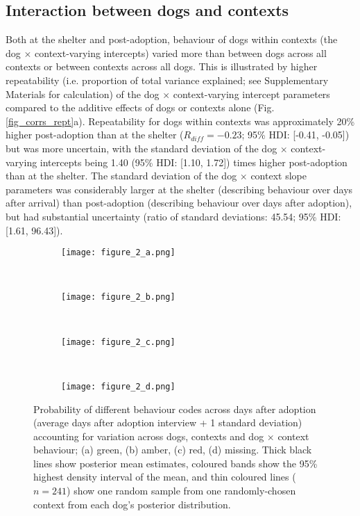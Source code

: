 \documentclass[fleqn,10pt]{wlscirep}
\begin{document}
\subsection*{Interaction between dogs and contexts}
Both at the shelter and post-adoption, behaviour of dogs within contexts (the dog $\times$ context-varying intercepts) varied more than between dogs across all contexts or between contexts across all dogs. This is illustrated by higher repeatability (i.e. proportion of total variance explained; see Supplementary Materials for calculation) of the dog $\times$ context-varying intercept parameters compared to the additive effects of dogs or contexts alone (Fig. \ref{fig_corrs_rept}a). Repeatability for dogs within contexts was approximately 20\% higher post-adoption than at the shelter ($R_{diff} = -0.23$; 95\% HDI: [-0.41, -0.05]) but was more uncertain, with the standard deviation of the dog $\times$ context-varying intercepts being 1.40 (95\% HDI: [1.10, 1.72]) times higher post-adoption than at the shelter. The standard deviation of the dog $\times$ context slope parameters was considerably larger at the shelter (describing behaviour over days after arrival) than post-adoption (describing behaviour over days after adoption), but had substantial uncertainty (ratio of standard deviations: 45.54; 95\% HDI: [1.61, 96.43]).

\begin{figure}
  \hspace{-2cm}%
  \begin{subfigure}{0.4\textwidth}
    \centering
    \texttt{[image: figure\_2\_a.png]}
  \end{subfigure}%
  ~%
  \hspace{-2cm}
  \begin{subfigure}{0.4\textwidth}
    \centering
    \texttt{[image: figure\_2\_b.png]}
  \end{subfigure}%
  ~%
  \hspace{-2cm}
  \begin{subfigure}{0.4\textwidth}
    \centering
    \texttt{[image: figure\_2\_c.png]}
  \end{subfigure}%
  ~%
  \hspace{-2cm}
  \begin{subfigure}{0.4\textwidth}
    \centering
    \texttt{[image: figure\_2\_d.png]}
  \end{subfigure}%

  \caption{Probability of different behaviour codes across days after adoption (average days after adoption interview + 1 standard deviation) accounting for variation across dogs, contexts and dog $\times$ context behaviour; (a) green, (b) amber, (c) red, (d) missing. Thick black lines show posterior mean estimates, coloured bands show the 95\% highest density interval of the mean, and thin coloured lines ($n = 241$) show one random sample from one randomly-chosen context from each dog's posterior distribution.}
  \label{fig_adoption_behaviour}
\end{figure}
\end{document}
